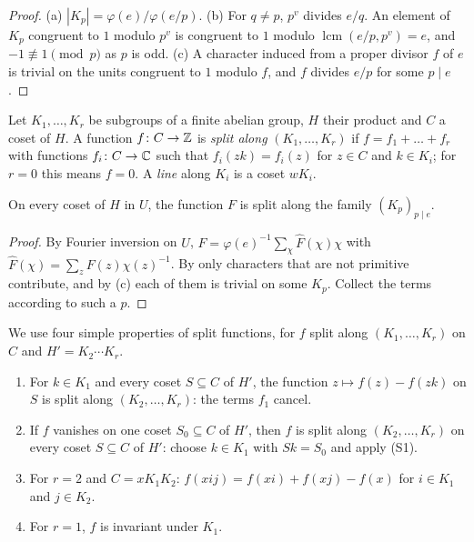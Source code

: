 \begin{proof}
(a) $|K_{p}|=\varphi(e)/\varphi(e/p)$. (b) For $q\ne p$, $p^{v}$ divides $e/q$.
An element of $K_{p}$ congruent to $1$ modulo $p^{v}$ is congruent to $1$
modulo $\operatorname{lcm}(e/p,p^{v})=e$, and $-1\not\equiv1\pmod p$ as $p$
is odd. (c) A character induced from a proper divisor $f$ of $e$ is trivial on
the units congruent to $1$ modulo $f$, and $f$ divides $e/p$ for some
$p\mid e$.
\end{proof}

\begin{definition}\label{def:split}
Let $K_{1},\dots,K_{r}$ be subgroups of a finite abelian group, $H$ their
product and $C$ a coset of $H$. A function $f\colon C\to\mathbb{Z}$ is \emph{split
along} $(K_{1},\dots,K_{r})$ if $f=f_{1}+\dots+f_{r}$ with functions
$f_{i}\colon C\to\mathbb{C}$ such that $f_{i}(zk)=f_{i}(z)$ for $z\in C$ and $k\in
K_{i}$; for $r=0$ this means $f=0$. A \emph{line} along $K_{i}$ is a coset
$wK_{i}$.
\end{definition}

\begin{lemma}\label{lem:splitF}
On every coset of $H$ in $U$, the function $F$ is split along the family
$(K_{p})_{p\mid e}$.
\end{lemma}

\begin{proof}
By Fourier inversion on $U$, $F=\varphi(e)^{-1}\sum_{\chi}\hat F(\chi)\chi$
with $\hat F(\chi)=\sum_{z}F(z)\chi(z)^{-1}$. By  only
characters that are not primitive contribute, and by (c) each of
them is trivial on some $K_{p}$. Collect the terms according to such a $p$.
\end{proof}

We use four simple properties of split functions, for $f$ split along
$(K_{1},\dots,K_{r})$ on $C$ and $H'=K_{2}\cdots K_{r}$.
\begin{enumerate}[label=\textup{(S\arabic*)}]
\item For $k\in K_{1}$ and every coset $S\subseteq C$ of $H'$, the function
$z\mapsto f(z)-f(zk)$ on $S$ is split along $(K_{2},\dots,K_{r})$: the terms
$f_{1}$ cancel.
\item If $f$ vanishes on one coset $S_{0}\subseteq C$ of $H'$, then $f$ is
split along $(K_{2},\dots,K_{r})$ on every coset $S\subseteq C$ of $H'$:
choose $k\in K_{1}$ with $Sk=S_{0}$ and apply (S1).
\item For $r=2$ and $C=xK_{1}K_{2}$: $f(xij)=f(xi)+f(xj)-f(x)$ for $i\in
K_{1}$ and $j\in K_{2}$.
\item For $r=1$, $f$ is invariant under $K_{1}$.
\end{enumerate}

